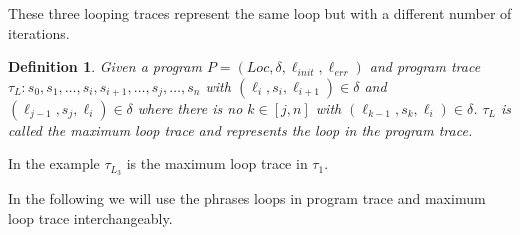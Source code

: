 \documentclass{article}
\newcounter{example}[section]
\newtheorem{mydef}{Definition}
\newcommand\mycom[1]{}
\newcommand\mycom[1]{#1}
\newcommand{\dd}[1]{\mycom{\todo[color=orange!40,inline]{\small DD: #1}}}
\newcommand{\ts}[1]{\mycom{\todo[color=green!40,inline]{\small TS: #1}}}
\begin{document}
\begin{figure}[H]
    \centering
\end{figure}
These three looping traces represent the same loop but with a different number of iterations.

\ts{The definition of loop trace also includes the traces starting with $\ell_4$ or $\ell_5$. Why do they not appear here? Or do you want to exclude them from the definition?}
\dd{Also: It seems unnecessary to have so many pictures of the relatively simple idea (a trace contains loop unwindings)}


\begin{mydef}
    Given a program $P = (Loc, \delta, \ell_{init}, \ell_{err})$ and program trace \\ $\tau_L: s_0, s_1, \ldots, s_i, s_{i+1}, \ldots, s_j, \ldots, s_n$ with $(\ell_i, s_i, \ell_{i+1}) \in \delta$ and $(\ell_{j-1}, s_j, \ell_i) \in \delta$ where there is no $k \in [j, n]$ with $(\ell_{k-1}, s_k, \ell_i) \in \delta$. $\tau_L$ is called the maximum loop trace and represents the loop in the program trace.
\end{mydef}
\ts{In the definition above, a loop trace is a sub trace starting with the loop head. 
Shouldn't $\tau_L$ then also start with the loop head? 
Otherwise, $\tau_{L_3}$ does not match the definition.}
In the example $\tau_{L_3}$ is the maximum loop trace in $\tau_1$. 
\dd{which example?}
In the following we will use the phrases loops in program trace and maximum loop trace interchangeably. 
\end{document}
